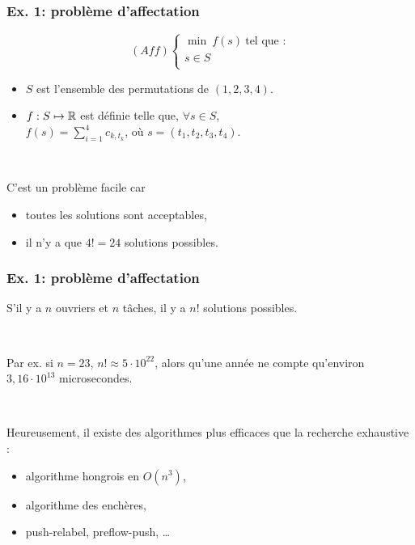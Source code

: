 \documentclass{beamer}
\newcommand{\R}{{\ensuremath\mathbb{R}}}
\begin{document}
\begin{frame}
  \frametitle{Ex. 1: problème d'affectation}

  \[
  (Aff) \left\{
  \begin{array}{c}
    \min \ f(s) \ \text{tel que :} \\
    s \in S \\
  \end{array}
  \right.
  \]

  \begin{itemize}
  \item $S$ est l'ensemble des permutations de $(1,2,3,4)$. 
  \item $f : S \mapsto \R$ est définie telle que, $\forall s \in S$, \\
    $f(s) = \sum_{i=1}^4 c_{k,t_k}$, où $s = (t_1,t_2,t_3,t_4)$.  
  \end{itemize}

  ~
  
  C'est un problème facile car
  \begin{itemize}
  \item toutes les solutions sont acceptables,
  \item il n'y a que $4! = 24$ solutions possibles. 
  \end{itemize}

\end{frame}

\begin{frame}
  \frametitle{Ex. 1: problème d'affectation}

  S'il y a $n$ ouvriers et $n$ tâches,
  il y a $n!$ solutions possibles. 

  ~
  
  Par ex. si $n = 23$, $n! \approx 5 \cdot 10^{22}$, alors qu'une
  année ne compte qu'environ $3,16 \cdot 10^{13}$ microsecondes.

  ~
  
  Heureusement, il existe des algorithmes plus efficaces
  que la recherche exhaustive :
  \begin{itemize}
  \item algorithme hongrois en $O(n^3)$,
  \item algorithme des enchères,
  \item push-relabel, preflow-push, \dots
  \end{itemize}
  
\end{frame}
\end{document}
